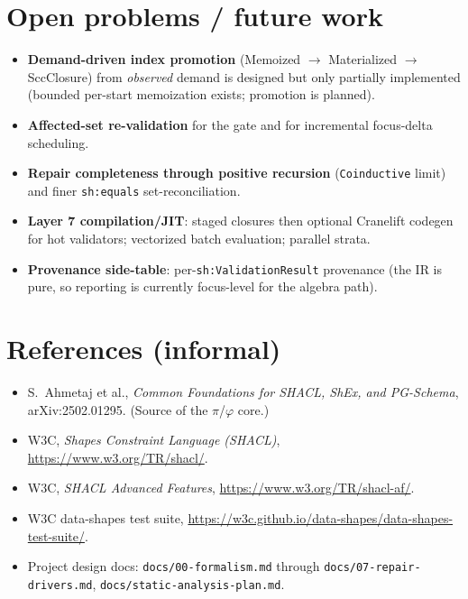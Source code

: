 \documentclass[11pt]{article}
\newcommand{\code}[1]{\texttt{#1}}
\theoremstyle{definition}
\begin{document}
\section*{Open problems / future work}
\begin{itemize}[leftmargin=1.4em]
  \item \textbf{Demand-driven index promotion} (Memoized $\to$ Materialized $\to$
  SccClosure) from \emph{observed} demand is designed but only partially
  implemented (bounded per-start memoization exists; promotion is planned).
  \item \textbf{Affected-set re-validation} for the gate and for incremental
  focus-delta scheduling.
  \item \textbf{Repair completeness through positive recursion}
  (\code{Coinductive} limit) and finer \code{sh:equals} set-reconciliation.
  \item \textbf{Layer 7 compilation/JIT}: staged closures then optional Cranelift
  codegen for hot validators; vectorized batch evaluation; parallel strata.
  \item \textbf{Provenance side-table}: per-\code{sh:ValidationResult} provenance
  (the IR is pure, so reporting is currently focus-level for the algebra path).
\end{itemize}

\section*{References (informal)}
\begin{itemize}[leftmargin=1.4em]
  \item S.\ Ahmetaj et al., \emph{Common Foundations for SHACL, ShEx, and
  PG-Schema}, arXiv:2502.01295. (Source of the $\pi$/$\varphi$ core.)
  \item W3C, \emph{Shapes Constraint Language (SHACL)}, \url{https://www.w3.org/TR/shacl/}.
  \item W3C, \emph{SHACL Advanced Features}, \url{https://www.w3.org/TR/shacl-af/}.
  \item W3C data-shapes test suite, \url{https://w3c.github.io/data-shapes/data-shapes-test-suite/}.
  \item Project design docs: \code{docs/00-formalism.md} through
  \code{docs/07-repair-drivers.md}, \code{docs/static-analysis-plan.md}.
\end{itemize}
\end{document}
